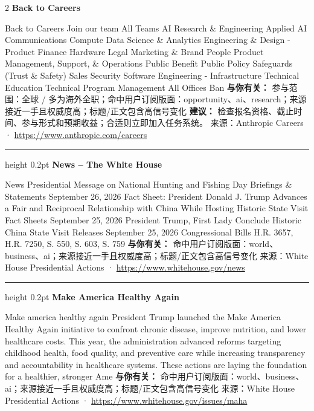 \documentclass[10.5pt]{ctexart}
\begin{document}
\begin{multicols}{2}
{\large\bfseries Back to Careers}\par
Back to Careers Join our team All Teams AI Research \& Engineering Applied AI Communications Compute Data Science \& Analytics Engineering \& Design - Product Finance Hardware Legal Marketing \& Brand People Product Management, Support, \& Operations Public Benefit Public Policy Safeguards (Trust \& Safety) Sales Security Software Engineering - Infrastructure Technical Education Technical Program Management All Offices Ban
\textbf{与你有关：} 参与范围：全球 / 多为海外全职；命中用户订阅版面：opportunity、ai、research；来源接近一手且权威度高；标题/正文包含高信号变化
\textbf{建议：} 检查报名资格、截止时间、参与形式和预期收益；合适则立即加入任务系统。
{\footnotesize\color{ormuted} 来源：Anthropic Careers · \url{https://www.anthropic.com/careers}}
\vspace{2mm}
\hrule height 0.2pt
\vspace{2mm}
{\large\bfseries News – The White House}\par
News Presidential Message on National Hunting and Fishing Day Briefings \& Statements September 26, 2026 Fact Sheet: President Donald J. Trump Advances a Fair and Reciprocal Relationship with China While Hosting Historic State Visit Fact Sheets September 25, 2026 President Trump, First Lady Conclude Historic China State Visit Releases September 25, 2026 Congressional Bills H.R. 3657, H.R. 7250, S. 550, S. 603, S. 759 
\textbf{与你有关：} 命中用户订阅版面：world、business、ai；来源接近一手且权威度高；标题/正文包含高信号变化
{\footnotesize\color{ormuted} 来源：White House Presidential Actions · \url{https://www.whitehouse.gov/news}}
\vspace{2mm}
\hrule height 0.2pt
\vspace{2mm}
{\large\bfseries Make America Healthy Again}\par
Make america healthy again President Trump launched the Make America Healthy Again initiative to confront chronic disease, improve nutrition, and lower healthcare costs. This year, the administration advanced reforms targeting childhood health, food quality, and preventive care while increasing transparency and accountability in healthcare systems. These actions are laying the foundation for a healthier, stronger Ame
\textbf{与你有关：} 命中用户订阅版面：world、business、ai；来源接近一手且权威度高；标题/正文包含高信号变化
{\footnotesize\color{ormuted} 来源：White House Presidential Actions · \url{https://www.whitehouse.gov/issues/maha}}

\end{multicols}
\end{document}
